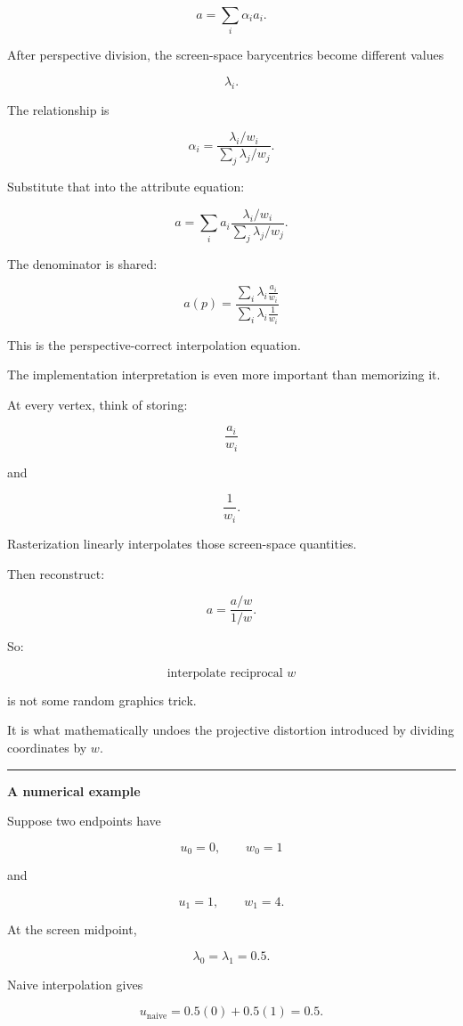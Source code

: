 \[
a=
\sum_i\alpha_i a_i.
\]

After perspective division, the screen-space barycentrics become different values

\[
\lambda_i.
\]

The relationship is

\[
\alpha_i
=
\frac{\lambda_i/w_i}
{\sum_j\lambda_j/w_j}.
\]

Substitute that into the attribute equation:

\[
a=
\sum_i
a_i
\frac{\lambda_i/w_i}
{\sum_j\lambda_j/w_j}.
\]

The denominator is shared:

\[
\boxed{
a(p)
=
\frac{
\displaystyle
\sum_i\lambda_i\frac{a_i}{w_i}
}{
\displaystyle
\sum_i\lambda_i\frac1{w_i}
}
}
\]

This is the perspective-correct interpolation equation.

The implementation interpretation is even more important than memorizing it.

At every vertex, think of storing:

\[
\frac{a_i}{w_i}
\]

and

\[
\frac1{w_i}.
\]

Rasterization linearly interpolates those screen-space quantities.

Then reconstruct:

\[
a=
\frac{a/w}{1/w}.
\]

So:

\[
\boxed{
\text{interpolate reciprocal }w
}
\]

is not some random graphics trick.

It is what mathematically undoes the projective distortion introduced by dividing coordinates by \(w\).

\begin{center}\rule{0.5\linewidth}{0.5pt}\end{center}

\textbf{A numerical example}

Suppose two endpoints have

\[
u_0=0,\qquad w_0=1
\]

and

\[
u_1=1,\qquad w_1=4.
\]

At the screen midpoint,

\[
\lambda_0=\lambda_1=0.5.
\]

Naive interpolation gives

\[
u_{\text{naive}}
=
0.5(0)+0.5(1)=0.5.
\]

